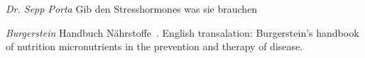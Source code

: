 \documentclass[../main.tex]{subfiles}
\begin{document}
\textit{Dr. Sepp Porta} Gib den Stresshormones was sie brauchen~\cite{PortaStress}

\vspace{5mm}
\noindent\textit{Burgerstein} Handbuch N\"ahrstoffe~\cite{BurgerNutrient}. English transalation:
Burgerstein’s handbook of nutrition micronutrients in the prevention and therapy of disease\cite{BurgerNutE}.
\end{document}
